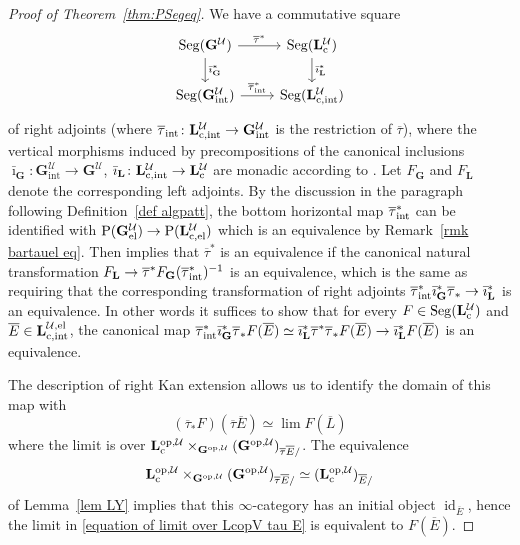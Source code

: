 \documentclass{amsart}
\numberwithin{theorem}{subsection}
\theoremstyle{definition}
\providecommand{\op}{\mathrm{op}}
\providecommand{\xel}{\mathrm{el}}
\providecommand{\xint}{\mathrm{int}}
\newcommand{\xU}{\mathcal{U}}
\newcommand{\id}{\operatorname{id}}
\newcommand{\Pre}{\name{P}}
\newcommand{\name}[1]{\ensuremath{\text{\textup{#1}}}}
\newcommand{\levelg}{\mathbf{L}}
\newcommand{\levelgconn}{\levelg_{\name{c}}}
\newcommand{\levelcUint}{\levelg_{\name{c},\name{int}}^{\xU}}
\newcommand{\levelcUel}{\levelg_{\name{c},\name{el}}^{\xU}}
\newcommand{\levelcU}{\levelgconn^{\xU}}
\newcommand{\oplevelcU}{\levelg^{\op,\xU}_{\name{c}}}
\newcommand{\bbY}{\mathbf{G}}
\newcommand{\bbYU}{\bbY^\xU}
\newcommand{\bbYUint}{\bbY_{\xint}^{\xU}}
\newcommand{\bbYUel}{\bbY_{\xel}^{\xU}}
\newcommand{\opbbYU}{\bbY^{\op,\xU}}
\newcommand{\bartau}{\overline{\tau}}
\newcommand{\bartauint}{\bartau_{\name{int}}}
\newcommand{\Seg}{\name{Seg}}
\begin{document}
\begin{proof}[Proof of Theorem~\ref{thm:PSegeq}]
We have a commutative square 
\[
\begin{tikzcd}
\Seg(\bbYU) \arrow{d}{\bar \imath^*_{\bbY}} \arrow{r}{\bartau^*} & \Seg(\levelcU) \arrow{d}{\bar\imath_{\levelg}^*} \\
\Seg(\bbYUint) \arrow{r}{\bartauint^*}  & \Seg(\levelcUint) 
\end{tikzcd}
\]
of right adjoints (where $\bartauint \colon  \levelcUint \to \bbYUint$ is the restriction of $\bartau$), where the vertical morphisms induced by precompositions of the canonical inclusions $\bar\imath_{\bbY}\colon \bbYUint \to \bbYU$, $\bar\imath_{\levelg}\colon \levelcUint \to \levelcU$ are monadic according to \cite[Corollary 8.2]{patterns1}. 
Let $F_{\bbY}$ and $F_\levelg$ denote the corresponding left adjoints. By the discussion in the paragraph following Definition~\ref{def algpatt}, the bottom horizontal map $\bartauint^*$ can be identified with $\Pre(\bbYUel)\to \Pre(\levelcUel)$ which is an equivalence by Remark~\ref{rmk bartauel eq}. Then \cite[Corollary 4.7.3.16]{ha} implies that $\bartau^{*}$ is an
equivalence if the canonical natural
transformation $F_{\levelg} \to
\bartau^{*} F_{\bbY} (\bartauint^{*})^{-1}$ is an equivalence, which is the same as requiring that the corresponding
transformation of right adjoints $\bartauint^{*} \bar\imath_{\bbY}^{*}\bartau_{*} \to \bar\imath_{\levelg}^{*}$ is an equivalence. In other words it suffices to show that for every $F \in \Seg(\levelcU)$ and $\overline E\in \levelg_{\name{c}, \xint}^{\xU, \xel}$, the canonical map $\bartauint^{*}\bar\imath_{\bbY}^{*}\bartau_{*}F(\overline E) \simeq
\bar\imath_{\levelg}^{*}\bartau^{*}\bartau_{*}F(\overline E) \to \bar\imath_{\levelg}^{*}F(\overline E)$ is an
equivalence.

The description of right Kan extension allows us to identify the domain of this map with
\begin{equation}\label{equation of limit over LcopV tau E}
(\bartau_{*}F)(\bartau \overline E) \simeq \lim F(\overline L)
\end{equation}
where the limit is over $\oplevelcU\times_{\opbbYU}(\opbbYU)_{\bartau \overline E/}$.
The equivalence \[ \oplevelcU\times_{\opbbYU}(\opbbYU)_{\bartau \overline E/} \simeq (\levelgconn^{\op, \xU})_{\overline E/}\] of Lemma~\ref{lem LY} implies that this $\infty$-category has an initial object $\id_{\overline E}$, hence the limit in \eqref{equation of limit over LcopV tau E} is equivalent to $F(\overline E)$.
\end{proof}
\end{document}
